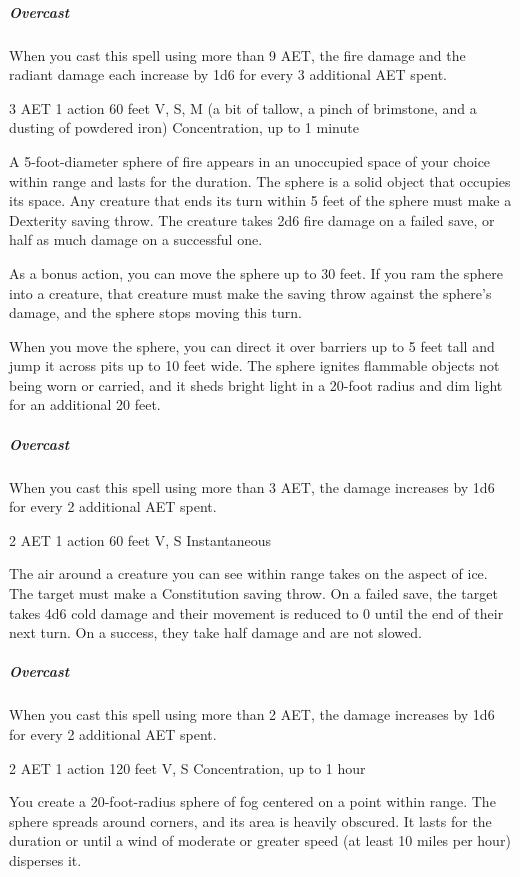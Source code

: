 \subparagraph*{Overcast} When you cast this spell using more than 9 AET, the fire damage and the radiant damage each increase by 1d6 for every 3 additional AET spent.


{3 AET}
{1 action}
{60 feet}
{V, S, M (a bit of tallow, a pinch of brimstone, and a dusting of powdered iron)}
{Concentration, up to 1 minute}

A 5-foot-diameter sphere of fire appears in an unoccupied space of your choice within range and lasts for the duration. The sphere is a solid object that occupies its space. Any creature that ends its turn within 5 feet of the sphere must make a Dexterity saving throw. The creature takes 2d6 fire damage on a failed save, or half as much damage on a successful one.

As a bonus action, you can move the sphere up to 30 feet. If you ram the sphere into a creature, that creature must make the saving throw against the sphere's damage, and the sphere stops moving this turn.

When you move the sphere, you can direct it over barriers up to 5 feet tall and jump it across pits up to 10 feet wide. The sphere ignites flammable objects not being worn or carried, and it sheds bright light in a 20-foot radius and dim light for an additional 20 feet.

\subparagraph*{Overcast} When you cast this spell using more than 3 AET, the damage increases by 1d6 for every 2 additional AET spent.


{2 AET}
{1 action}
{60 feet}
{V, S}
{Instantaneous}

The air around a creature you can see within range takes on the aspect of ice. The target must make a Constitution saving throw. On a failed save, the target takes 4d6 cold damage and their movement is reduced to 0 until the end of their next turn. On a success, they take half damage and are not slowed.

\subparagraph*{Overcast} When you cast this spell using more than 2 AET, the damage increases by 1d6 for every 2 additional AET spent.


{2 AET}
{1 action}
{120 feet}
{V, S}
{Concentration, up to 1 hour}

You create a 20-foot-radius sphere of fog centered on a point within range. The sphere spreads around corners, and its area is heavily obscured. It lasts for the duration or until a wind of moderate or greater speed (at least 10 miles per hour) disperses it.


